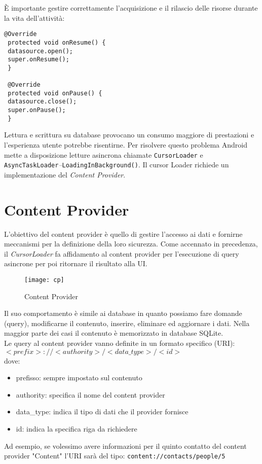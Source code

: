 È importante gestire correttamente l'acquisizione e il rilascio delle risorse
durante la vita dell'attività:
\begin{lstlisting}[frame=single]
@Override
 protected void onResume() {
 datasource.open();
 super.onResume();
 }

 @Override
 protected void onPause() {
 datasource.close();
 super.onPause();
 }
\end{lstlisting}
Lettura e scrittura su database provocano un consumo maggiore di prestazioni e 
l'esperienza utente potrebbe risentirne. Per risolvere questo problema Android
mette a disposizione letture asincrona chiamate \texttt{CursorLoader} e
\texttt{AsyncTaskLoader}\textit{--}\texttt{LoadingInBackground()}. Il cursor
Loader richiede un implementazione del \textit{Content Provider}.
\section{Content Provider}
L'obiettivo del content provider è quello di gestire l'accesso ai dati e
fornirne meccanismi per la definizione della loro sicurezza. Come accennato in
precedenza, il \textit{CursorLoader} fa affidamento al content provider per
l'esecuzione di query asincrone per poi ritornare il risultato alla UI.
\begin{figure}
    \centering
    \texttt{[image: cp]}
    \caption{Content Provider}
    \label{fig:my_label}
\end{figure}
Il suo comportamento è simile ai database in quanto possiamo fare domande
(query), modificarne il contenuto, inserire, eliminare ed aggiornare i dati.
Nella maggior parte dei casi il contenuto è memorizzato in database SQLite. \\
Le query al content provider vanno definite in un formato
specifico (URI):\\$<prefix>://<authority>/<data\_type>/<id>$\\
dove:
\begin{itemize}
    \item prefisso: sempre impostato sul contenuto
    \item authority: specifica il nome del content provider
    \item data\_type: indica il tipo di dati che il provider fornisce
    \item id: indica la specifica riga da richiedere
\end{itemize}
Ad esempio, se volessimo avere informazioni per il quinto contatto del content
provider "Content" l'URI sarà del tipo: \texttt{content://contacts/people/5}
